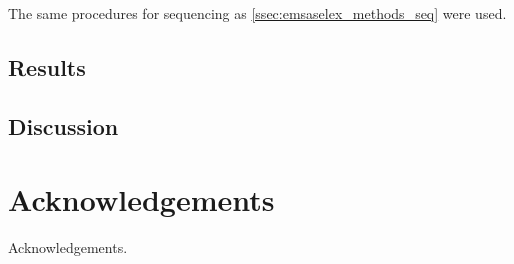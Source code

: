 \documentclass[parskip=full, numbers=noenddot]{scrreprt}
\begin{document}
The same procedures for sequencing as \ref{ssec:emsaselex_methods_seq} were used.


\section{Results}
\label{sec:pcrbias_results}

\section{Discussion}
\label{sec:pcrbias_discussion}

\chapter{Acknowledgements}
\label{ch:ack}

Acknowledgements.

\printbibliography
\end{document}
